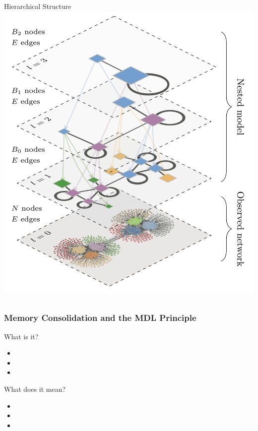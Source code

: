 \begin{frame}
\begin{columns}
    \begin{column}{0.5\textwidth}
      \begin{block}{Hierarchical Structure}
          \includegraphics[width=\textwidth]{images/hierarchical-block-model.png}
      \end{block}
    \end{column}
  \end{columns}
\end{frame}

\begin{frame}
  \frametitle{Memory Consolidation and the MDL Principle}
  \begin{block}{What is it?}
    \begin{itemize}
      \item
      \item
      \item
    \end{itemize}
  \end{block}
  \begin{block}{What does it mean?}
    \begin{itemize}
      \item
      \item
      \item
    \end{itemize}
  \end{block}
\end{frame}

